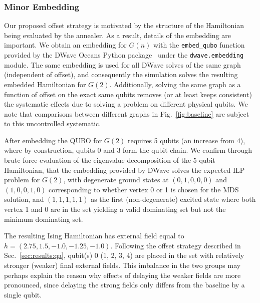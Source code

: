 \documentclass[prd,twocolumn,tightenlines,preprintnumbers,showpacs,superscriptaddress,notitlepage,nofootinbib,eqsecnum,floatfix,longbibliography,aps,10pt]{revtex4-2}
\begin{document}
\subsubsection{Minor Embedding}
\label{sec:methods:minor_embedding}
Our proposed offset strategy is motivated by the structure of the Hamiltonian being evaluated by the annealer.
As a result, details of the embedding are important. We obtain an embedding for $G(n)$ with the \texttt{embed\_qubo} function provided by the DWave Oceans Python package~\cite{dwave_oceans} under the \texttt{dwave.embedding} module.
The same embedding is used for all DWave solves of the same graph (independent of offset), and consequently the simulation solves the resulting embedded Hamiltonian for $G(2)$.
Additionally, solving the same graph as a function of offset on the exact same qubits removes (or at least keeps consistent) the systematic effects due to solving a problem on different physical qubits.
We note that comparisons between different graphs in Fig.~\ref{fig:baseline} are subject to this uncontrolled systematic.

After embedding the QUBO for $G(2)$ requires 5 qubits (an increase from 4), where by construction, qubits 0 and 3 form the qubit chain.
We confirm through brute force evaluation of the eigenvalue decomposition of the 5 qubit Hamiltonian, that the embedding provided by DWave solves the expected ILP problem for $G(2)$, with degenerate ground states at $(0, 1, 0, 0, 0)$ and $(1, 0, 0, 1, 0)$ corresponding to whether vertex 0 or 1 is chosen for the MDS solution, and $(1, 1, 1, 1, 1)$ as the first (non-degenerate) excited state where both vertex 1 and 0 are in the set yielding a valid dominating set but not the minimum dominating set.

The resulting Ising Hamiltonian has external field equal to $h = (2.75, 1.5, -1.0, -1.25, -1.0)$.
Following the offset strategy described in Sec.~\ref{sec:results:qa}, qubit(s) 0 (1, 2, 3, 4) are placed in the set with relatively stronger (weaker) final external fields.
This imbalance in the two groups may perhaps explain the reason why effects of delaying the weaker fields are more pronounced, since delaying the strong fields only differs from the baseline by a single qubit.



\end{document}
